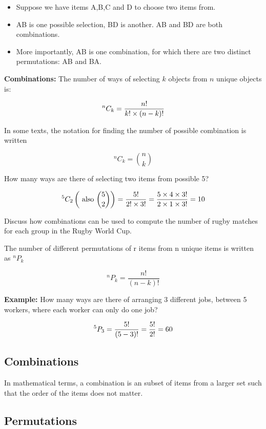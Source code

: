 \documentclass[]{report}
\begin{document}
{	\begin{itemize}
		\item Suppose we have items A,B,C and D to choose two items from.
		\item AB is one possible selection, BD is another. AB and BD are both combinations.
		\item More importantly, AB is one combination, for which there are two distinct permutations: AB and BA.
	\end{itemize}

	
	\textbf{Combinations: }
	The number of ways of selecting $k$ objects from $n$ unique objects is:
	
	\[ ^n C_k = {n!  \over k! \times (n-k)!} \]
	
	In some texts, the notation for finding the number of possible combination is written
	
	\[ ^n C_k =  {n \choose k} \]
	

	How many ways are there of selecting two items from possible 5?
	
	\[ ^5 C_2   \left( \mbox{ also }  {5 \choose 2}  \right) =  {5!  \over 2! \times 3!} =  {5 \times 4 \times 3!  \over 2 \times 1 \times 3!} = 10  \]
	
	Discuss how combinations can be used to compute the number of rugby matches for each group in the Rugby World Cup.
	
	The number of different permutations of r items from n unique items is written as $^n P_k$
	
	
	\[ ^n P_k = \frac{n!}{(n-k)!}\]

	\textbf{Example:}
	How many ways are there of arranging 3 different jobs, between 5 workers, where each worker can only do one job?
	
	
	\[ ^5 P_3 = \frac{5!}{(5-3)!}  = {5! \over 2!} = 60\]
	

	\subsection{Combinations}
	In mathematical terms, a combination is an subset of items from a larger set such that the order of the items does not matter.

\subsection{Permutations}

}
\end{document}
